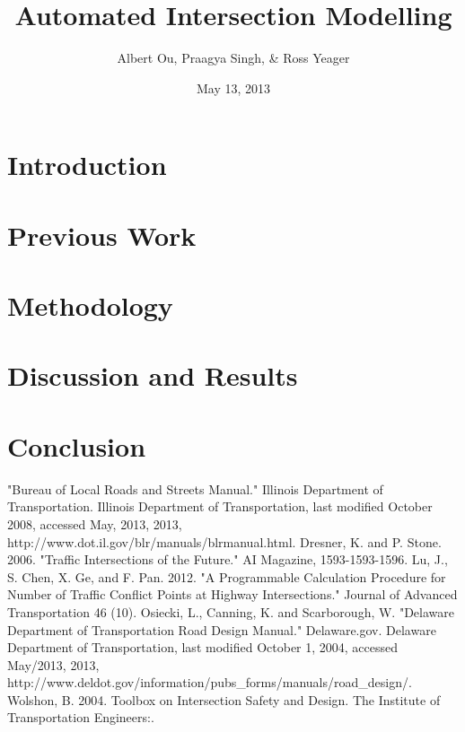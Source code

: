 \documentclass[10pt]{article}
\title{Automated Intersection Modelling}
\author{Albert Ou, Praagya Singh, & Ross Yeager}
\date{May 13, 2013}
\begin{document}
\maketitle
\section{Introduction}

\section{Previous Work}

\section{Methodology}

\section{Discussion and Results}

\section{Conclusion}

\begin{thebibliography}{100}
 "Bureau of Local Roads and Streets Manual." Illinois Department of Transportation. Illinois Department of Transportation, last modified October 2008, accessed May, 2013, 2013, http://www.dot.il.gov/blr/manuals/blrmanual.html.
 Dresner, K. and P. Stone. 2006. "Traffic Intersections of the Future." AI Magazine, 1593-1593-1596.
 Lu, J., S. Chen, X. Ge, and F. Pan. 2012. "A Programmable Calculation Procedure for Number of Traffic Conflict Points at Highway Intersections." Journal of Advanced Transportation 46 (10).
 Osiecki, L., Canning, K. and Scarborough, W. "Delaware Department of Transportation Road Design Manual." Delaware.gov. Delaware Department of Transportation, last modified October 1, 2004, accessed May/2013, 2013, http://www.deldot.gov/information/pubs_forms/manuals/road_design/.
 Wolshon, B. 2004. Toolbox on Intersection Safety and Design. The Institute of Transportation Engineers:.
\end{thebibliography}
\end{document}
